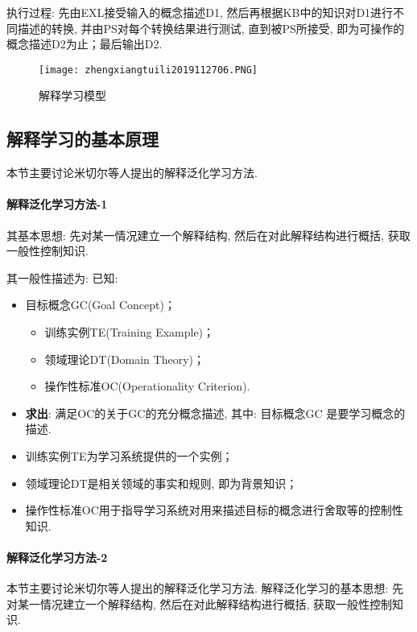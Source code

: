 执行过程: 先由EXL接受输入的概念描述D1, 然后再根据KB中的知识对D1进行不同描述的转换, 并由PS对每个转换结果进行测试, 直到被PS所接受, 即为可操作的概念描述D2为止；最后输出D2.

\begin{figure}[H]
\centering
\texttt{[image: zhengxiangtuili2019112706.PNG]}
\caption{解释学习模型}
\label{AI32fig2706}
\end{figure}

\subsection{解释学习的基本原理}
本节主要讨论米切尔等人提出的解释泛化学习方法.
\paragraph{解释泛化学习方法-1}
其基本思想: 先对某一情况建立一个解释结构, 然后在对此解释结构进行概括, 获取一般性控制知识.

其一般性描述为: 已知:
\begin{itemize}
\item 目标概念GC(Goal Concept)；
      \begin{itemize}
          \item 训练实例TE(Training Example)；
          \item 领域理论DT(Domain Theory)；
           \item 操作性标准OC(Operationality Criterion).
       \end{itemize}
\item \textbf{求出}: 满足OC的关于GC的充分概念描述, 其中: 目标概念GC 是要学习概念的描述.
\end{itemize}

\begin{itemize}
\item 训练实例TE为学习系统提供的一个实例；
\item 领域理论DT是相关领域的事实和规则, 即为背景知识；
\item 操作性标准OC用于指导学习系统对用来描述目标的概念进行舍取等的控制性知识.
\end{itemize}
\paragraph{解释泛化学习方法-2}
本节主要讨论米切尔等人提出的解释泛化学习方法.
解释泛化学习的基本思想: 先对某一情况建立一个解释结构, 然后在对此解释结构进行概括, 获取一般性控制知识.

